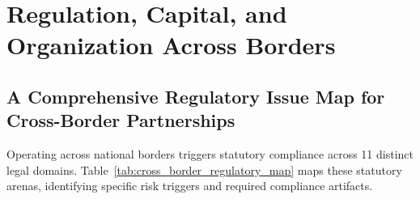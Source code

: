 \section{Regulation, Capital, and Organization Across Borders}
\label{sec:ch30_regulation_capital_organization}

\subsection{A Comprehensive Regulatory Issue Map for Cross-Border Partnerships}
\label{sec:regulatory_issue_map_cross_border}

Operating across national borders triggers statutory compliance across 11 distinct legal domains. Table~\ref{tab:cross_border_regulatory_map} maps these statutory arenas, identifying specific risk triggers and required compliance artifacts.

